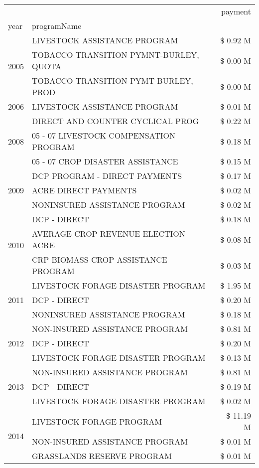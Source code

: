 \begin{tabular}{llr}
\toprule
 &  & payment \\
year & programName &  \\
\midrule
\multirow[t]{3}{*}{2005} & LIVESTOCK ASSISTANCE PROGRAM & \$ 0.92 M \\
 & TOBACCO TRANSITION PYMNT-BURLEY, QUOTA & \$ 0.00 M \\
 & TOBACCO TRANSITION PYMT-BURLEY, PROD & \$ 0.00 M \\
\cline{1-3}
2006 & LIVESTOCK ASSISTANCE PROGRAM & \$ 0.01 M \\
\cline{1-3}
\multirow[t]{3}{*}{2008} & DIRECT AND COUNTER CYCLICAL PROG & \$ 0.22 M \\
 & 05 - 07 LIVESTOCK COMPENSATION PROGRAM & \$ 0.18 M \\
 & 05 - 07 CROP DISASTER ASSISTANCE & \$ 0.15 M \\
\cline{1-3}
\multirow[t]{3}{*}{2009} & DCP PROGRAM - DIRECT PAYMENTS & \$ 0.17 M \\
 & ACRE DIRECT PAYMENTS & \$ 0.02 M \\
 & NONINSURED ASSISTANCE PROGRAM & \$ 0.02 M \\
\cline{1-3}
\multirow[t]{3}{*}{2010} & DCP - DIRECT & \$ 0.18 M \\
 & AVERAGE CROP REVENUE ELECTION-ACRE & \$ 0.08 M \\
 & CRP BIOMASS CROP ASSISTANCE PROGRAM & \$ 0.03 M \\
\cline{1-3}
\multirow[t]{3}{*}{2011} & LIVESTOCK FORAGE DISASTER PROGRAM & \$ 1.95 M \\
 & DCP - DIRECT & \$ 0.20 M \\
 & NONINSURED ASSISTANCE PROGRAM & \$ 0.18 M \\
\cline{1-3}
\multirow[t]{3}{*}{2012} & NON-INSURED ASSISTANCE PROGRAM & \$ 0.81 M \\
 & DCP - DIRECT & \$ 0.20 M \\
 & LIVESTOCK FORAGE DISASTER PROGRAM & \$ 0.13 M \\
\cline{1-3}
\multirow[t]{3}{*}{2013} & NON-INSURED ASSISTANCE PROGRAM & \$ 0.81 M \\
 & DCP - DIRECT & \$ 0.19 M \\
 & LIVESTOCK FORAGE DISASTER PROGRAM & \$ 0.02 M \\
\cline{1-3}
\multirow[t]{3}{*}{2014} & LIVESTOCK FORAGE PROGRAM & \$ 11.19 M \\
 & NON-INSURED ASSISTANCE PROGRAM & \$ 0.01 M \\
 & GRASSLANDS RESERVE PROGRAM & \$ 0.01 M \\

\end{tabular}
